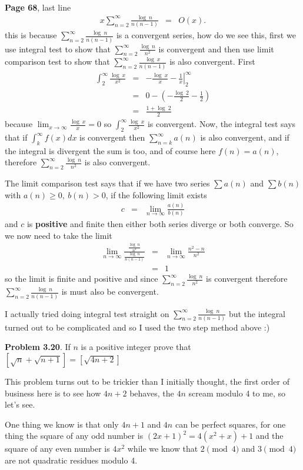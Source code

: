 \documentclass[aps,preprint,preprintnumbers,nofootinbib,showpacs,prd]{revtex4-1}
\newcommand{\nbea}{\begin{eqnarray*}}
\newcommand{\neea}{\end{eqnarray*}}
\begin{document}
{\bf Page 68}, last line
%
\nbea
x \sum_{n=2}^{\infty} \frac{\log~n}{n(n-1)} & = & O(x).
\neea
%
this is because $\sum_{n=2}^{\infty} \frac{\log~n}{n(n-1)}$ is a convergent series, how do we see this, first we use integral test to show that $\sum_{n=2}^{\infty} \frac{\log~n}{n^2}$ is convergent and then use limit comparison test to show that $\sum_{n=2}^{\infty} \frac{\log~x}{n(n-1)}$ is also convergent. First
%
\nbea
\int_2^\infty \frac{\log~x}{x^2} & = & \left. -\frac{\log~x}{x} - \frac{1}{x} \right |_2^\infty \\
& = & 0 - \left ( -\frac{\log~2}{2} - \frac{1}{2} \right ) \\
& = & \frac{1 + \log~2}{2}
\neea
%
because $\lim_{x\to\infty}\frac{\log~x}{x} = 0$ so $\int_2^\infty \frac{\log~x}{x^2}$ is convergent. Now, the integral test says that  if $\int_k^\infty f(x) dx$ is convergent then $\sum_{n=k}^{\infty} a(n)$ is also convergent, and if the integral is divergent the sum is too, and of course here $f(n) = a(n)$, therefore $\sum_{n=2}^{\infty} \frac{\log~n}{n^2}$ is also convergent.

The limit comparison test says that if we have two series $\sum a(n)$ and $\sum b(n)$ with $a(n)\ge0,~b(n) > 0$, if the following limit exists
%
\nbea
c & = & \lim_{n\to\infty} \frac{a(n)}{b(n)}
\neea
%
and $c$ is {\bf positive} and finite then either both series diverge or both converge. So we now need to take the limit
%
\nbea
\lim_{n\to\infty}\frac{\frac{\log~n}{n^2}}{\frac{\log~n}{n(n-1)}} & = & \lim_{n\to\infty} \frac{n^2 - n}{n^2} \\
& = & 1
\neea
%
so the limit is finite and positive and since $\sum_{n=2}^{\infty} \frac{\log~n}{n^2}$ is convergent therefore $\sum_{n=2}^{\infty} \frac{\log~n}{n(n-1)}$ is must also be convergent.

I actually tried doing integral test straight on $\sum_{n=2}^{\infty} \frac{\log~n}{n(n-1)}$ but the integral turned out to be complicated and so I used the two step method above :)

{\bf Problem 3.20}. If $n$ is a positive integer prove that $[\sqrt{n} + \sqrt{n+1}] = [\sqrt{4n+2}]$

This problem turns out to be trickier than I initially thought, the first order of business here is to see how $4n+2$ behaves, the $4n$ scream modulo 4 to me, so let's see.

One thing we know is that only $4n+1$ and $4n$ can be perfect squares, for one thing the square of any odd number is $(2x+1)^2 = 4(x^2+x)+1$ and the square of any even number is $4x^2$ while we know that $2 \pmod{4}$ and $3 \pmod{4}$ are not quadratic residues modulo 4.
\end{document}
